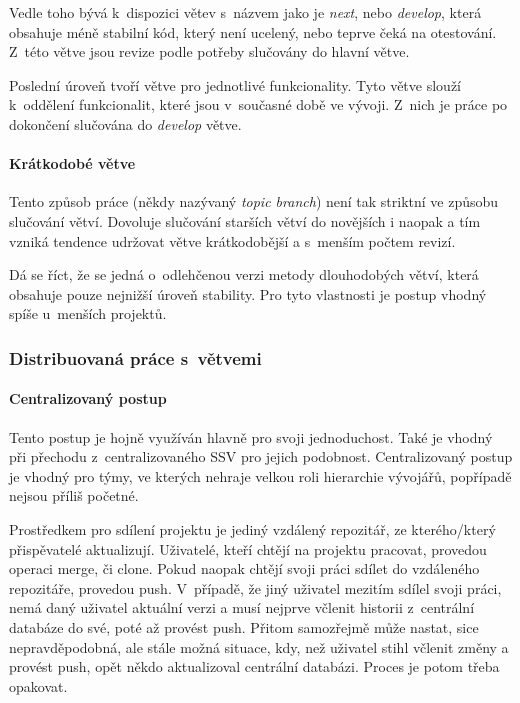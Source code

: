 \documentclass[
  biblatex,
  glossaries,
  index
]{kidiplom}
\begin{document}
Vedle toho bývá k~dispozici větev s~názvem jako je {\it next}, nebo {\it develop}, která obsahuje méně stabilní kód, který není ucelený, nebo teprve čeká na otestování. Z~této větve jsou revize podle potřeby slučovány do hlavní větve.

Poslední úroveň tvoří větve pro jednotlivé funkcionality. Tyto větve slouží k~oddělení funkcionalit, které jsou v~současné době ve vývoji. Z~nich je práce po dokončení slučována do {\it develop} větve.

\paragraph*{Krátkodobé větve}
Tento způsob práce (někdy nazývaný {\it topic branch}) není tak striktní ve způsobu slučování větví. Dovoluje slučování starších větví do novějších i naopak a tím vzniká tendence udržovat větve krátkodobější a s~menším počtem revizí.

Dá se říct, že se jedná o~odlehčenou verzi metody dlouhodobých větví, která obsahuje pouze nejnižší úroveň stability. Pro tyto vlastnosti je postup vhodný spíše u~menších projektů.

\subsubsection{Distribuovaná práce s~větvemi}
\paragraph*{Centralizovaný postup}

Tento postup je hojně využíván hlavně pro svoji jednoduchost. Také je vhodný při přechodu z~centralizovaného SSV pro jejich podobnost. Centralizovaný postup je vhodný pro týmy, ve kterých nehraje velkou roli hierarchie vývojářů, popřípadě nejsou příliš početné.

Prostředkem pro sdílení projektu je jediný vzdálený repozitář, ze kterého/který přispěvatelé aktualizují. Uživatelé, kteří chtějí na projektu pracovat, provedou operaci merge, či clone. Pokud naopak chtějí svoji práci sdílet do vzdáleného repozitáře, provedou push. V~případě, že jiný uživatel mezitím sdílel svoji práci, nemá daný uživatel aktuální verzi a musí nejprve včlenit historii z~centrální databáze do své, poté až provést push. Přitom samozřejmě může nastat, sice nepravděpodobná, ale stále možná situace, kdy, než uživatel stihl včlenit změny a provést push, opět někdo aktualizoval centrální databázi. Proces je potom třeba opakovat.
\end{document}
